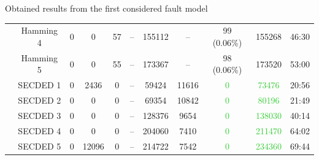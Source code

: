 \begin{frame}{Obtained results from the first considered fault model}
\begin{table}[H]
\begin{tabular}{@{}ccccccccccc@{}}
                                                               & Hamming 4     & 0     & 0           & 57         & --          & \num{155112}                             & --                                      & 99  {\tiny (0.06\%)}        & \num{155268} & 46:30                                   \\
                                                               & Hamming 5     & 0     & 0           & 55         & --          & \num{173367}                             & --                                      & 98  {\tiny (0.06\%)}        & \num{173520} & 53:00                                   \\
                                                               & SECDED 1      & 0     & 2436        & 0          & --          & \num{59424 }                             & \num{11616}                             & \textcolor{LimeGreen}{0}                           & \textcolor{LimeGreen}{\num{73476 }} & 20:56                                   \\
                                                               & SECDED 2      & 0     & 0           & 0          & --          & \num{69354 }                             & \num{10842}                             & \textcolor{LimeGreen}{0}                           & \textcolor{LimeGreen}{\num{80196 }} & 21:49                                   \\
                                                               & SECDED 3      & 0     & 0           & 0          & --          & \num{128376}                             & \num{9654 }                             & \textcolor{LimeGreen}{0}                           & \textcolor{LimeGreen}{\num{138030}} & 40:14                                   \\
                                                               & SECDED 4      & 0     & 0           & 0          & --          & \num{204060}                             & \num{7410 }                             & \textcolor{LimeGreen}{0}                           & \textcolor{LimeGreen}{\num{211470}} & 64:02                                   \\
                                                               & SECDED 5      & 0     & \num{12096} & 0          & --          & \num{214722}                             & \num{7542 }                             & \textcolor{LimeGreen}{0}                           & \textcolor{LimeGreen}{\num{234360}} & 69:44                                   \\
            \bottomrule
        \end{tabular}
    \end{table}
\end{frame}

